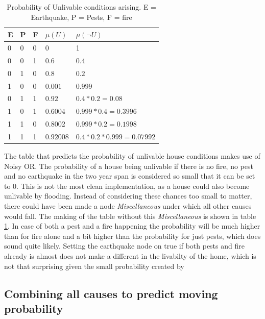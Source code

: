 \documentclass[12pt]{article} %
\begin{document}
\begin{table}
\begin{tabular}{|lll|ll|}
  \hline
  E & P & F & $\mu(U)$ & $\mu(\neg U)$   \\ \hline
  0 & 0 & 0 & 0 & 1 \\
  0 & 0 & 1  &  $0.6$       & $0.4$       \\ 
  0 & 1 & 0  &  $0.8$       & $0.2$       \\
  1 & 0 & 0  &  $0.001$     & $0.999$     \\                     
  0 & 1 & 1  &  $0.92$      & $0.4 * 0.2 =0.08$\\       
  1 & 0 & 1  &  $0.6004$    & $0.999 * 0.4 = 0.3996$\\   
  1 & 1 & 0  &  $0.8002$    & $0.999 * 0.2 = 0.1998$\\         
  1 & 1 & 1  &  $0.92008$   & $0.4 * 0.2 * 0.999 = 0.07992$ \\
  \hline
\end{tabular}
\caption{Probability of Unlivable conditions arising. 
        E = Earthquake, P = Pests, F = fire}
\label{tab:unlivable}
\end{table}

\FloatBarrier
The table that predicts the probability of unlivable house conditions makes use
of Noisy OR. The probability of a house being unlivable if there is no fire, no
pest and no earthquake in the two year span is considered so small that it can
be set to 0. This is not the most clean implementation, as a house could also
become unlivable by flooding. Instead of considering these chances too small to
matter, there could have been made a node \emph{Miscellaneous} under which all
other causes would fall. The making of the table without this
\emph{Miscellaneous} is shown in table \ref{tab:unlivable}. In case of both a
pest and a fire happening the probability will be much higher than for fire
alone and a bit higher than the probability for just pests, which does sound
quite likely. Setting the earthquake node on true if both pests and fire already
is almost does not make a different in the livabilty of the home, which is not
that surprising given the small probability created by 



\subsection{Combining all causes to predict moving probability} %
\end{document}
